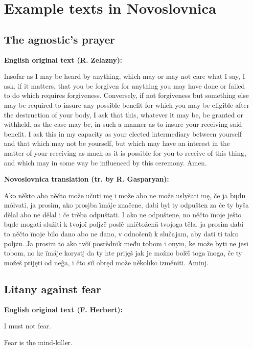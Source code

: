 \section{Example texts in Novoslovnica}


\subsection{The agnostic’s prayer}

\textbf{English original text (R. Zelazny):}

Insofar as I may be heard by anything, which may or may not care what I say, I ask, if it matters, that you be forgiven for anything you may have done or failed to do which requires forgiveness. Conversely, if not forgiveness but something else may be required to insure any possible benefit for which you may be eligible after the destruction of your body, I ask that this, whatever it may be, be granted or withheld, as the case may be, in such a manner as to insure your receiving said benefit. I ask this in my capacity as your elected intermediary between yourself and that which may not be yourself, but which may have an interest in the matter of your receiving as much as it is possible for you to receive of this thing, and which may in some way be influenced by this ceremony. Amen.


\textbf{Novoslovnica translation (tr. by R. Gasparyan):}

Ako někto abo něčto može učuti mę i može abo ne može uslyšati mę, če ja bųdu mòlvati, ja prosim, ako prosjba ïmáje značene, dabi byl ty odpušten za če ty byša dělal abo ne dělal i če trěba odpuštati. I ako ne odpuštene, no něčto ïnoje ješto bųde mogati služiti k tvojoǐ poljzě poslě uničtoženä tvojoga těla, ja prosim dabi to něčto ïnoje bilo dano abo ne dano, v odnošenü k slučajam, aby dati ti taku poljzu. Ja prosim to ako tvôǐ posrědnik među tobom i onym, ke može byti ne jesi tobom, no ke ïmáje korystj da ty hte prijęš jak je možno bolëǐ toga ïnoga, če ty možeš prijęti od neĝa, i čto sïǐ obręd može několïko izměniti. Aminj.

\subsection{Litany against fear}

\textbf{English original text (F. Herbert):}

I must not fear.

Fear is the mind-killer.

